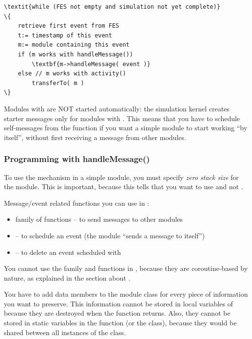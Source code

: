 \begin{Verbatim}[commandchars=\\\{\}]
\textit{while (FES not empty and simulation not yet complete)}
\{
    retrieve first event from FES
    t:= timestamp of this event
    m:= module containing this event
    if (m works with handleMessage())
        \textbf{m->handleMessage( event )}
    else // m works with activity()
        transferTo( m )
\}
\end{Verbatim}

Modules with  are NOT started automatically:
the simulation kernel creates starter messages
only for modules with . This means that you have to
schedule self-messages from the
 function if you want a 
simple module to start working ``by itself'', without first receiving
a message from other modules.


\subsubsection{Programming with handleMessage()}


To use the  mechanism in a
simple module, you must specify \textit{zero
  stack size} for the module. This is
important, because this tells {\opp} that you want to use
 and not .

Message/event related functions you can use in :

\begin{itemize}
  \item{ family of functions -- to send messages to other modules}
  \item{ -- to schedule an event (the module ``sends a message to itself'')}
  \item{ -- to delete an event scheduled with }
\end{itemize}

You cannot use the  family and
 functions in , because they are
coroutine-based by nature, as explained in the section about
.

You have to add data members to the module class for every piece
of information you want to preserve. This information cannot
be stored in local variables of  because they
are destroyed when the function returns. Also, they cannot be
stored in static variables in the function (or the class), because
they would be shared between all instances of the class.


